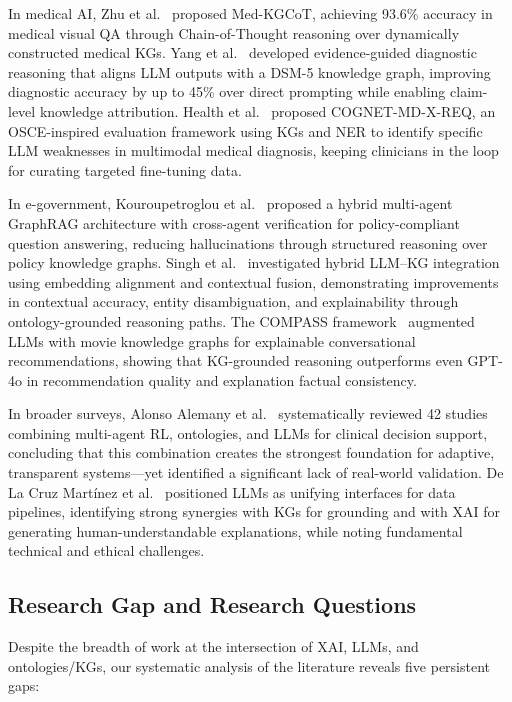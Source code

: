 \documentclass[lnbip]{svmultln}
\begin{document}
In medical AI, Zhu et al.~\cite{medkgcot2025} proposed Med-KGCoT, achieving 93.6\% accuracy in medical visual QA through Chain-of-Thought reasoning over dynamically constructed medical KGs. Yang et al.~\cite{depress2025} developed evidence-guided diagnostic reasoning that aligns LLM outputs with a DSM-5 knowledge graph, improving diagnostic accuracy by up to 45\% over direct prompting while enabling claim-level knowledge attribution. Health et al.~\cite{cognet2025} proposed COGNET-MD-X-REQ, an OSCE-inspired evaluation framework using KGs and NER to identify specific LLM weaknesses in multimodal medical diagnosis, keeping clinicians in the loop for curating targeted fine-tuning data.

In e-government, Kouroupetroglou et al.~\cite{egov2025} proposed a hybrid multi-agent GraphRAG architecture with cross-agent verification for policy-compliant question answering, reducing hallucinations through structured reasoning over policy knowledge graphs. Singh et al.~\cite{hybridkg2025} investigated hybrid LLM--KG integration using embedding alignment and contextual fusion, demonstrating improvements in contextual accuracy, entity disambiguation, and explainability through ontology-grounded reasoning paths. The COMPASS framework~\cite{compass2025} augmented LLMs with movie knowledge graphs for explainable conversational recommendations, showing that KG-grounded reasoning outperforms even GPT-4o in recommendation quality and explanation factual consistency.

In broader surveys, Alonso Alemany et al.~\cite{macds2026} systematically reviewed 42 studies combining multi-agent RL, ontologies, and LLMs for clinical decision support, concluding that this combination creates the strongest foundation for adaptive, transparent systems---yet identified a significant lack of real-world validation. De La Cruz Mart\'{i}nez et al.~\cite{pipe2024} positioned LLMs as unifying interfaces for data pipelines, identifying strong synergies with KGs for grounding and with XAI for generating human-understandable explanations, while noting fundamental technical and ethical challenges.

\subsection{Research Gap and Research Questions}
\label{sec:gap}

Despite the breadth of work at the intersection of XAI, LLMs, and ontologies/KGs, our systematic analysis of the literature reveals five persistent gaps:
\end{document}
